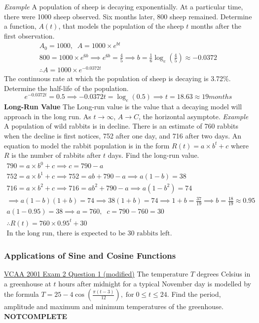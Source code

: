 \documentclass{article}
\begin{document}
				\textit{Example}\newline
				A population of sheep is decaying exponentially. At a particular time, there were 1000 sheep observed. Six months later, 800 sheep remained. Determine a function, $A(t)$, that models the population of the sheep $t$ months after the first observation.
				\begin{gather*}
					A_0=1000,\;\;A=1000\times e^{bt}\\
					800=1000\times e^{6b} \implies e^{6b}=\frac{4}{5} \implies b=\frac{1}{6}\log_e\left(\frac{4}{5}\right)\approx-0.0372 \\
					\therefore A=1000\times e^{-0.0372t}
				\end{gather*}
				The continuous rate at which the population of sheep is decaying is 3.72\%. Determine the half-life of the population.
				\[
				e^{-0.0372t}=0.5 \implies -0.0372t = \log_e(0.5) \implies t=18.63\approx 19 months
				\]
				\textbf{Long-Run Value}\newline
				The Long-run value is the value that a decaying model will approach in the long run. As $t\to\infty$, $A\to C$, the horizontal asymptote.\newline\newline
				\textit{Example}\newline
				A population of wild rabbits is in decline. There is an estimate of 760 rabbits when the decline is first notices, 752 after one day, and 716 after two days. An equation to model the rabbit population is in the form $R(t)=a\times b^t + c$ where $R$ is the number of rabbits after $t$ days. Find the long-run value.\newline
				\begin{gather*}
					790=a\times b^0 + c \implies c=790-a\\
					752=a\times b^1 + c \implies 752=ab+790-a \implies a(1-b)=38\\
					716=a\times b^2 + c \implies 716=ab^2+790-a \implies a(1-b^2)=74\\
					\implies a(1-b)(1+b)=74 \implies 38(1+b)=74 \implies 1+b=\frac{37}{19} \implies b=\frac{18}{19}\approx0.95 \\
					a(1-0.95)=38 \implies a=760,\;\;c=790-760=30 \\
					\therefore R(t)=760\times0.95^t + 30 \\
					\text{In the long run, there is expected to be 30 rabbits left.}
				\end{gather*}
			\subsubsection{Applications of Sine and Cosine Functions}
				\underline{VCAA 2001 Exam 2 Question 1 (modified)}\newline
				The temperature $T$ degrees Celsius in a greenhouse at $t$ hours after midnight for a typical November day is modelled by the formula $T = 25-4\cos(\frac{\pi(t-3)}{12}),\;\text{for}\;0\le t\le 24$. Find the period, amplitude and maximum and minimum temperatures of the greenhouse.\newline\newline
				\textbf{NOTCOMPLETE}\newline
\end{document}
